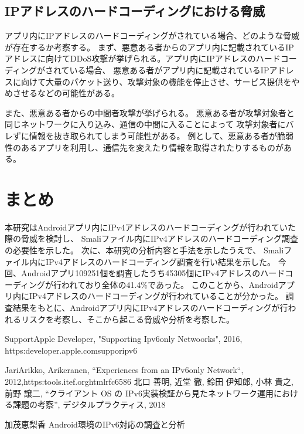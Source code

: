 \documentclass[a4j]{jarticle}
\begin{document}
\subsection{IPアドレスのハードコーディングにおける脅威}
アプリ内にIPアドレスのハードコーディングがされている場合、どのような脅威が存在するか考察する。
まず、悪意ある者からのアプリ内に記載されているIPアドレスに向けてDDoS攻撃が挙げられる。アプリ内にIPアドレスのハードコーディングがされている場合、
悪意ある者がアプリ内に記載されているIPアドレスに向けて大量のパケット送り、攻撃対象の機能を停止させ、サービス提供をやめさせるなどの可能性がある。

また、悪意ある者からの中間者攻撃が挙げられる。
悪意ある者が攻撃対象者と同じネットワークに入り込み、通信の中間に入ることによって
攻撃対象者にバレずに情報を抜き取られてしまう可能性がある。
例として、悪意ある者が脆弱性のあるアプリを利用し、通信先を変えたり情報を取得されたりするものがある。
\newpage
\section{まとめ}
本研究はAndroidアプリ内にIPv4アドレスのハードコーディングが行われていた際の脅威を検討し、
Smaliファイル内にIPv4アドレスのハードコーディング調査の必要性を示した。
次に、本研究の分析内容と手法を示したうえで、
Smaliファイル内にIPv4アドレスのハードコーディング調査を行い結果を示した。
今回、Androidアプリ109251個を調査したうち45305個にIPv4アドレスのハードコーディングが行われており全体の41.4\%であった。
このことから、Androidアプリ内にIPv4アドレスのハードコーディングが行われていることが分かった。
調査結果をもとに、Androidアプリ内にIPv4アドレスのハードコーディングが行われるリスクを考察し、そこから起こる脅威や分析を考察した。
\newpage
\begin{thebibliography}{99}
	
	Support\-Apple Developer, "Supporting Ipv6\-only Netwoorks", 2016, https:\/\/developer.apple.com\/suppor\/ipv6
	
	JariArikko, Arikeranen, “Experiences from an IPv6\-only Network“, 2012,https:\/\/tools.itef.org\/html\/rfc6586
	北口 善明, 近堂 徹, 鈴田 伊知郎, 小林 貴之, 前野 譲二, “クライアント OS の IPv6実装検証から見たネットワーク運用における課題の考察”, デジタルプラクティス, 2018


加茂恵梨香 Android環境のIPv6対応の調査と分析
\end{thebibliography}
\end{document}
